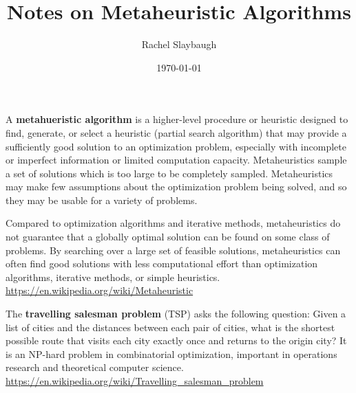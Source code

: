 \documentclass[12pt,twoside]{article}
\date{\today}
\title{Notes on Metaheuristic Algorithms}
\author{Rachel Slaybaugh}
\begin{document}
\maketitle

A\textbf{ metahueristic algorithm} is a higher-level procedure or heuristic designed to find, generate, or select a heuristic (partial search algorithm) that may provide a sufficiently good solution to an optimization problem, especially with incomplete or imperfect information or limited computation capacity. Metaheuristics sample a set of solutions which is too large to be completely sampled. Metaheuristics may make few assumptions about the optimization problem being solved, and so they may be usable for a variety of problems. 

Compared to optimization algorithms and iterative methods, metaheuristics do not guarantee that a globally optimal solution can be found on some class of problems. By searching over a large set of feasible solutions, metaheuristics can often find good solutions with less computational effort than optimization algorithms, iterative methods, or simple heuristics.\\
\href{https://en.wikipedia.org/wiki/Metaheuristic}{https://en.wikipedia.org/wiki/Metaheuristic}

\vspace*{1 em}
The \textbf{travelling salesman problem} (TSP) asks the following question: Given a list of cities and the distances between each pair of cities, what is the shortest possible route that visits each city exactly once and returns to the origin city? It is an NP-hard problem in combinatorial optimization, important in operations research and theoretical computer science.\\ \href{https://en.wikipedia.org/wiki/Travelling_salesman_problem}{https://en.wikipedia.org/wiki/Travelling\_salesman\_problem}
\end{document}
